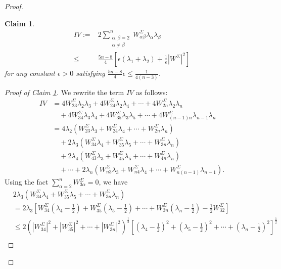 \documentclass[a4, 12pt]{amsart}
\theoremstyle{plain}
\newtheorem{claim}{Claim}[section]
\begin{document}
\begin{proof}
	\begin{claim}\label{claim:IV}
		\begin{equation*}\label{eq:claim-IV}
		\begin{aligned}
			IV := &2\sum_{\substack{\alpha,\beta=2 \\ \alpha\neq\beta}}^n W^{\Sigma}_{\alpha\beta}\lambda_\alpha\lambda_\beta\\
			 \leq& \frac{5n-8}{4}\left[\epsilon(\lambda_1+\lambda_2) + \frac{1}{\epsilon}|W^{\Sigma}|^2\right]
		\end{aligned}
		\end{equation*}
		for any constant $\epsilon > 0$ satisfying $\frac{5n-8}{4}\epsilon \leq \frac{1}{4(n-3)}$.
	\end{claim}
	
	\begin{proof}[Proof of Claim \ref{claim:IV}]
		We rewrite the term $IV$ as follows:
		\begin{align*}
			IV &= 4W^{\Sigma}_{23}\lambda_{2}\lambda_{3} + 4W^{\Sigma}_{24}\lambda_{2}\lambda_{4} + \cdots + 4W^{\Sigma}_{2n}\lambda_{2}\lambda_{n} \\
			&\quad + 4W^{\Sigma}_{34}\lambda_{3}\lambda_{4} + 4W^{\Sigma}_{35}\lambda_{3}\lambda_{5} + \cdots + 4W^{\Sigma}_{(n-1)n}\lambda_{n-1}\lambda_{n} \\
			&= 4\lambda_{2}(W^{\Sigma}_{23}\lambda_{3} + W^{\Sigma}_{24}\lambda_{4} + \cdots + W^{\Sigma}_{2n}\lambda_{n}) \\
			&\quad + 2\lambda_3(W^{\Sigma}_{34}\lambda_{4} + W^{\Sigma}_{35}\lambda_{5} + \cdots + W^{\Sigma}_{3n}\lambda_{n}) \\
			&\quad + 2\lambda_4(W^{\Sigma}_{43}\lambda_{3} + W^{\Sigma}_{45}\lambda_{5} + \cdots + W^{\Sigma}_{4n}\lambda_{n}) \\
			&\quad + \cdots + 2\lambda_n(W^{\Sigma}_{n3}\lambda_{3} + W^{\Sigma}_{n4}\lambda_{4} + \cdots + W^{\Sigma}_{n(n-1)}\lambda_{n-1}).
		\end{align*}
		Using the fact $\sum_{\alpha=2}^n W^{\Sigma}_{3\alpha} = 0$, we have
		\begin{align*}
			&2\lambda_3(W^{\Sigma}_{34}\lambda_{4} + W^{\Sigma}_{35}\lambda_{5} + \cdots + W^{\Sigma}_{3n}\lambda_{n}) \\
			&= 2\lambda_3\left[W^{\Sigma}_{34}\left(\lambda_{4} - \frac{1}{2}\right) + W^{\Sigma}_{35}\left(\lambda_{5} - \frac{1}{2}\right) + \cdots + W^{\Sigma}_{3n}\left(\lambda_{n} - \frac{1}{2}\right) - \frac{1}{2}W^{\Sigma}_{32}\right] \\
			&\leq 2\left(|W^{\Sigma}_{34}|^2 + |W^{\Sigma}_{35}|^2 + \cdots + |W^{\Sigma}_{3n}|^2\right)^{\frac{1}{2}}\left[\left(\lambda_{4} - \frac{1}{2}\right)^2 + \left(\lambda_{5} - \frac{1}{2}\right)^2 + \cdots + \left(\lambda_{n} - \frac{1}{2}\right)^2\right]^{\frac{1}{2}} \\

\end{align*}
\end{proof}
\end{proof}
\end{document}
